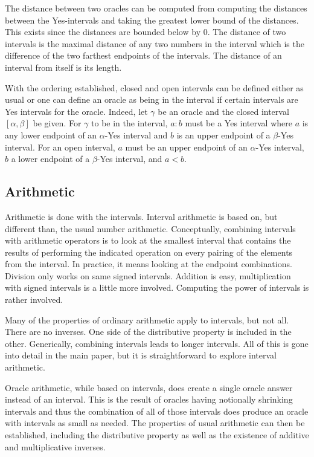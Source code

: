 \documentclass[12pt]{article}
\theoremstyle{remark}
\begin{document}
The distance between two oracles can be computed from computing the distances between the Yes-intervals and taking the greatest lower bound of the distances. This exists since the distances are bounded below by 0. The distance of two intervals is the maximal distance of any two numbers in the interval which is the difference of the two farthest endpoints of the intervals. The distance of an interval from itself is its length. 

With the ordering established, closed and open intervals can be defined either as usual or one can define an oracle as being in the interval if certain intervals are Yes intervals for the oracle. Indeed, let $\gamma$ be an oracle and the closed interval $[\alpha, \beta]$ be given. For $\gamma$ to be in the interval, $a:b$ must be a Yes interval where $a$ is any lower endpoint of an $\alpha$-Yes interval and $b$ is an upper endpoint of a $\beta$-Yes interval. For an open interval, $a$ must be an upper endpoint of an $\alpha$-Yes interval, $b$ a lower endpoint of a $\beta$-Yes interval, and $a\lt b$. 

\subsection{Arithmetic}

Arithmetic is done with the intervals. Interval arithmetic is based on, but different than, the usual number arithmetic. Conceptually, combining intervals with arithmetic operators is to look at the smallest interval that contains the results of performing the indicated operation on every pairing of the elements from the interval. In practice, it means looking at the endpoint combinations. Division only works on same signed intervals. Addition is easy, multiplication with signed intervals is a little more involved. Computing the power of intervals is rather involved. 


Many of the properties of ordinary arithmetic apply to intervals, but not all. There are no inverses. One side of the distributive property is included in the other. Generically, combining intervals leads to longer intervals. All of this is gone into detail in the main paper, but it is straightforward to explore interval arithmetic. 

Oracle arithmetic, while based on intervals, does create a single oracle answer instead of an interval. This is the result of oracles having notionally shrinking intervals and thus the combination of all of those intervals does produce an oracle with intervals as small as needed. The properties of usual arithmetic can then be established, including the distributive property as well as the existence of additive and multiplicative inverses.   
\end{document}
